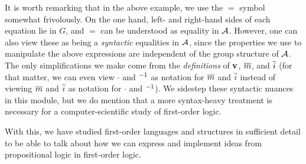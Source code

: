 \begin{remark}
    It is worth remarking that in the above example, we use the $=$ symbol somewhat frivolously. On the one hand, left- and right-hand sides of each equation lie in $G$, and $=$ can be understood as equality in $\mathcal{A}$. However, one can also view these as being a \textit{syntactic} equalities in $\mathcal{A}$, since the properties we use to manipulate the above expressions are independent of the group structure of $\mathcal{A}$. The only simplifications we make come from the \textit{definitions} of  $\mathbf{v}$, $\overline{m}$, and $\overline{i}$ (for that matter, we can even view $\cdot$ and $^{-1}$ as notation for $\overline{m}$ and $\overline{i}$ instead of viewing $\overline{m}$ and $\overline{i}$ as notation for $\cdot$ and $^{-1}$). We sidestep these syntactic nuances in this module, but we do mention that a more syntax-heavy treatment is necessary for a computer-scientific study of first-order logic.
\end{remark}

With this, we have studied first-order languages and structures in sufficient detail to be able to talk about how we can express and implement ideas from propositional logic in first-order logic.
